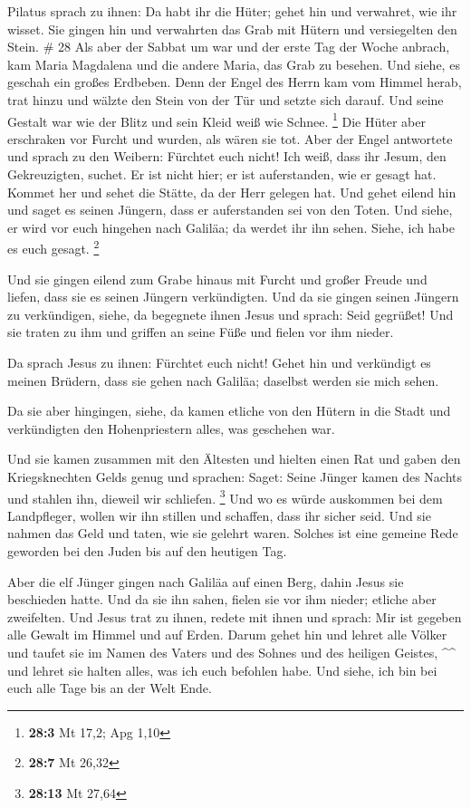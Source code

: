  Pilatus sprach zu ihnen: Da habt ihr die Hüter; gehet hin
und verwahret, wie ihr wisset.  Sie gingen hin und
verwahrten das Grab mit Hütern und versiegelten den Stein. \# 28
 Als aber der Sabbat um war und der erste Tag der Woche
anbrach, kam Maria Magdalena und die andere Maria, das Grab zu besehen.
 Und siehe, es geschah ein großes Erdbeben. Denn der Engel
des Herrn kam vom Himmel herab, trat hinzu und wälzte den Stein von der
Tür und setzte sich darauf.  Und seine Gestalt war wie der
Blitz und sein Kleid weiß wie Schnee. \footnote{\textbf{28:3} Mt 17,2;
  Apg 1,10}  Die Hüter aber erschraken vor Furcht und
wurden, als wären sie tot.  Aber der Engel antwortete und
sprach zu den Weibern: Fürchtet euch nicht! Ich weiß, dass ihr Jesum,
den Gekreuzigten, suchet.  Er ist nicht hier; er ist
auferstanden, wie er gesagt hat. Kommet her und sehet die Stätte, da der
Herr gelegen hat.  Und gehet eilend hin und saget es seinen
Jüngern, dass er auferstanden sei von den Toten. Und siehe, er wird vor
euch hingehen nach Galiläa; da werdet ihr ihn sehen. Siehe, ich habe es
euch gesagt. \footnote{\textbf{28:7} Mt 26,32}

 Und sie gingen eilend zum Grabe hinaus mit Furcht und
großer Freude und liefen, dass sie es seinen Jüngern verkündigten. Und
da sie gingen seinen Jüngern zu verkündigen,  siehe, da
begegnete ihnen Jesus und sprach: Seid gegrüßet! Und sie traten zu ihm
und griffen an seine Füße und fielen vor ihm nieder.

 Da sprach Jesus zu ihnen: Fürchtet euch nicht! Gehet hin
und verkündigt es meinen Brüdern, dass sie gehen nach Galiläa; daselbst
werden sie mich sehen.

 Da sie aber hingingen, siehe, da kamen etliche von den
Hütern in die Stadt und verkündigten den Hohenpriestern alles, was
geschehen war.

 Und sie kamen zusammen mit den Ältesten und hielten einen
Rat und gaben den Kriegsknechten Gelds genug  und sprachen:
Saget: Seine Jünger kamen des Nachts und stahlen ihn, dieweil wir
schliefen. \footnote{\textbf{28:13} Mt 27,64}  Und wo es
würde auskommen bei dem Landpfleger, wollen wir ihn stillen und
schaffen, dass ihr sicher seid.  Und sie nahmen das Geld
und taten, wie sie gelehrt waren. Solches ist eine gemeine Rede geworden
bei den Juden bis auf den heutigen Tag.

 Aber die elf Jünger gingen nach Galiläa auf einen Berg,
dahin Jesus sie beschieden hatte.  Und da sie ihn sahen,
fielen sie vor ihm nieder; etliche aber zweifelten.  Und
Jesus trat zu ihnen, redete mit ihnen und sprach: Mir ist gegeben alle
Gewalt im Himmel und auf Erden.  Darum gehet hin und lehret
alle Völker und taufet sie im Namen des Vaters und des Sohnes und des
heiligen Geistes, \^{}\^{}  und lehret sie halten alles,
was ich euch befohlen habe. Und siehe, ich bin bei euch alle Tage bis an
der Welt Ende.
